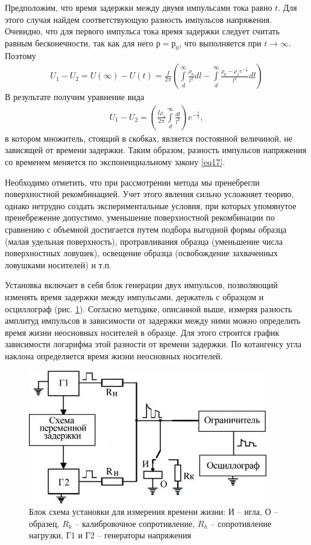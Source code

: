 \documentclass[a4paper,12pt]{article}
\let\tempint\int
\renewcommand{\int}{\tempint\limits}
\begin{document}
Предположим, что время задержки между двумя импульсами тока равно $t$. Для этого случая найдем соответствующую разность импульсов напряжения. Очевидно, что для первого импульса тока время задержки следует считать равным бесконечности, так как для него $р = р_0$, что выполняется при $t\to\infty$. Поэтому
\begin{gather}
	\label{eq21}
	U_{1}-U_{2}=U(\infty)-U(t)=\frac{I}{2 \pi}\left(\int_{d}^{\infty} \frac{\rho_{0}}{l^{2}} d l-\int_{d}^{\infty} \frac{\rho_{0}-\rho_{1} e^{-\frac{t}{\tau}}}{l^{2}} d l\right)
\end{gather}
В результате получим уравнение вида
\begin{gather}
 	\label{eq22}
 	U_{1}-U_{2}=\left(\frac{I \rho_{1}}{2 \pi} \int_{d}^{\infty} \frac{d l}{l^{2}}\right) e^{-\frac{t}{\tau}},
 \end{gather}
 в котором множитель, стоящий в скобках, является постоянной величиной, не зависящей от времени задержки. Таким образом, разность импульсов напряжения со временем меняется по экспоненциальному закону \eqref{eq17}.

Необходимо отметить, что при рассмотрении метода мы пренебрегли поверхностной рекомбинацией. Учет этого явления сильно усложняет теорию, однако нетрудно создать экспериментальные условия, при которых упомянутое пренебрежение допустимо, уменьшение поверхностной рекомбинации по сравнению с объемной достигается путем подбора выгодной формы образца (малая удельная поверхность), протравливания образца (уменьшение числа поверхностных ловушек), освещение образца (освобождение захваченных ловушками носителей) и т.п.

Установка включает в себя блок генерации двух импульсов, позволяющий изменять время задержки между импульсами, держатель с образцом и осциллограф (рис.  \ref{fig:figure11}). Согласно методике, описанной выше, измеряя разность амплитуд импульсов в зависимости от задержки между ними можно определить время жизни неосновных носителей в образце. Для этого строится график зависимости логарифма этой разности от времени задержки. По котангенсу угла наклона определяется время жизни неосновных носителей.
\begin{figure}[H]
	\centering
	\includegraphics[]{12}
	\caption{Блок схема установки для измерения времени жизни:
И -- игла, О -- образец, $R_k$ -- калибровочное сопротивление, $R_h$ -- сопротивление нагрузки, Г1 и Г2 -- генераторы напряжения }
	\label{fig:figure11}
\end{figure}
\end{document}
